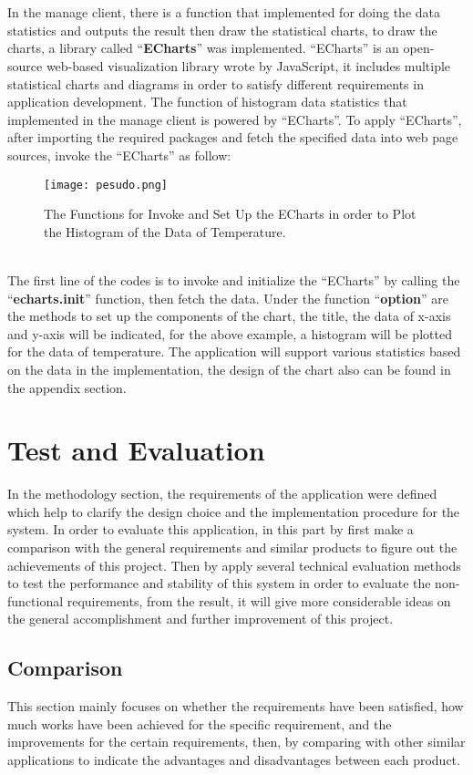 \documentclass[12pt]{article}
\begin{document}
\\
\\In the manage client, there is a function that implemented for doing the data statistics and outputs the result then draw the statistical charts, to draw the charts, a library called ``\textbf{ECharts}'' was implemented. ``ECharts'' is an open-source web-based visualization library wrote by JavaScript, it includes multiple statistical charts and diagrams in order to satisfy different requirements in application development. The function of histogram data statistics that implemented in the manage client is powered by ``ECharts''. To apply ``ECharts'', after importing the required packages and fetch the specified data into web page sources, invoke the ``ECharts'' as follow:
\begin{figure}[ht]
\centering
\texttt{[image: pesudo.png]}
\caption{The Functions for Invoke and Set Up the ECharts in order to Plot the Histogram of the Data of Temperature.}
\label{fig:label}
\end{figure}
\\The first line of the codes is to invoke and initialize the ``ECharts'' by calling the ``\textbf{echarts.init}'' function, then fetch the data. Under the function ``\textbf{option}'' are the methods to set up the components of the chart, the title, the data of x-axis and y-axis will be indicated, for the above example, a histogram will be plotted for the data of temperature. The application will support various statistics based on the data in the implementation, the design of the chart also can be found in the appendix section. 
\section{Test and Evaluation}
In the methodology section, the requirements of the application were defined which help to clarify the design choice and the implementation procedure for the system. In order to evaluate this application, in this part by first make a comparison with the general requirements and similar products to figure out the achievements of this project. Then by apply several technical evaluation methods to test the performance and stability of this system in order to evaluate the non-functional requirements, from the result, it will give more considerable ideas on the general accomplishment and further improvement of this project.
\subsection{Comparison}
This section mainly focuses on whether the requirements have been satisfied, how much works have been achieved for the specific requirement, and the improvements for the certain requirements, then, by comparing with other similar applications to indicate the advantages and disadvantages between each product.
\end{document}
